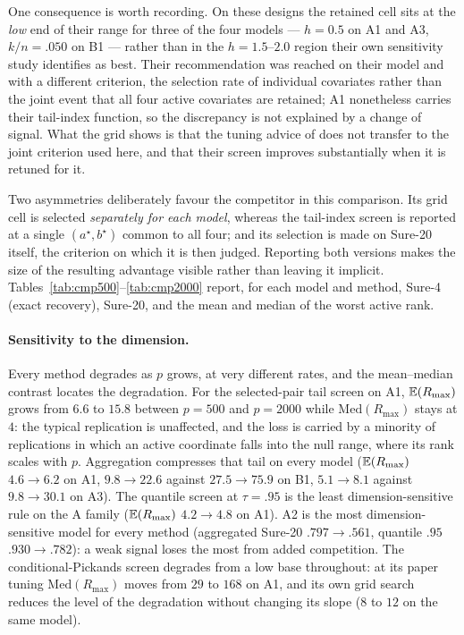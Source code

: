 One consequence is worth recording. On these designs the retained cell
sits at the \emph{low} end of their range for three of the four models
--- $h=0.5$ on A1 and A3, $k/n=.050$ on B1 --- rather than in the
$h=1.5$--$2.0$ region their own sensitivity study identifies as best.
Their recommendation was reached on their model and with a different
criterion, the selection rate of individual covariates rather than the
joint event that all four active covariates are retained; A1 nonetheless
carries their tail-index function, so the discrepancy is not explained by
a change of signal. What the grid shows is that the tuning advice of
\citet{yoshidaUmezu2026} does not transfer to the joint criterion used
here, and that their screen improves substantially when it is retuned
for it.

Two asymmetries deliberately favour the competitor in this comparison.
Its grid cell is selected \emph{separately for each model}, whereas the
tail-index screen is reported at a single $(a^\star,b^\star)$ common to
all four; and its selection is made on Sure-20 itself, the criterion on
which it is then judged. Reporting both versions makes the size of the
resulting advantage visible rather than leaving it implicit.
Tables~\ref{tab:cmp500}--\ref{tab:cmp2000} report, for each model and
method, Sure-4 (exact recovery), Sure-20, and the mean and median of the
worst active rank.







\paragraph{Sensitivity to the dimension.}
Every method degrades as $p$ grows, at very different rates, and the
mean--median contrast locates the degradation. For the selected-pair
tail screen on A1, $\mathbb E(R_{\max})$ grows from $6.6$ to $15.8$ between
$p=500$ and $p=2000$ while $\mathrm{Med}(R_{\max})$ stays at $4$: the
typical replication is unaffected, and the loss is carried by a
minority of replications in which an active coordinate falls into the
null range, where its rank scales with $p$. Aggregation compresses that
tail on every model ($\mathbb E(R_{\max})$ $4.6\to6.2$ on A1, $9.8\to22.6$
against $27.5\to75.9$ on B1, $5.1\to8.1$ against $9.8\to30.1$ on A3).
The quantile screen at $\tau=.95$ is the least dimension-sensitive rule
on the A family ($\mathbb E(R_{\max})$ $4.2\to4.8$ on A1). A2 is the most
dimension-sensitive model for every method (aggregated Sure-20
$.797\to.561$, quantile $.95$ $.930\to.782$): a weak signal loses the
most from added competition. The conditional-Pickands screen degrades
from a low base throughout: at its paper tuning
$\mathrm{Med}(R_{\max})$ moves from $29$ to $168$ on A1, and its own
grid search reduces the level of the degradation without changing its
slope ($8$ to $12$ on the same model).

